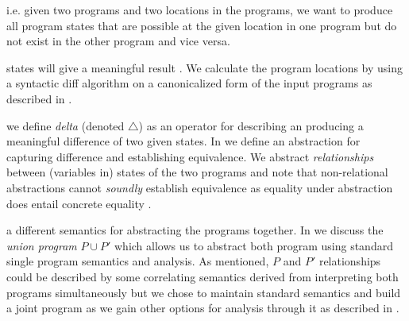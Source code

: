 i.e. given two programs and two locations in the programs, we want to produce all program states that are possible at the given location in one program but do not exist in the other program and vice versa.

states will give a meaningful result . We calculate the program locations by using a syntactic diff algorithm on a canonicalized form of the input programs as described in .

 we define \emph{delta} (denoted $\triangle$) as an operator for describing an producing a meaningful difference of two given states. In  we define an abstraction for capturing difference and establishing equivalence. We abstract \emph{relationships} between (variables in) states of the two programs and note that non-relational abstractions cannot \emph{soundly} establish equivalence as equality under abstraction does entail concrete equality .

a different semantics for abstracting the programs together. In  we discuss the \emph{union program} $P \cup P'$ which allows us to abstract both program using standard single program semantics and analysis. As mentioned, $P$ and $P'$ relationships could be described by some correlating semantics derived from interpreting both programs simultaneously but we chose to maintain standard semantics and build a joint program as we gain other options for analysis through it as described in \subref{}.

